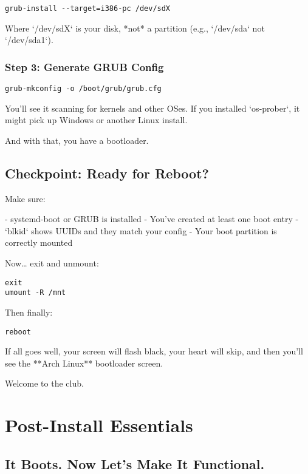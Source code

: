\documentclass[12pt]{book}
\begin{document}
\begin{lstlisting}
grub-install --target=i386-pc /dev/sdX
\end{lstlisting}

Where `/dev/sdX` is your disk, *not* a partition (e.g., `/dev/sda` not `/dev/sda1`).

\subsection*{Step 3: Generate GRUB Config}

\begin{lstlisting}
grub-mkconfig -o /boot/grub/grub.cfg
\end{lstlisting}

You’ll see it scanning for kernels and other OSes. If you installed `os-prober`, it might pick up Windows or another Linux install.

And with that, you have a bootloader.

\section{Checkpoint: Ready for Reboot?}

Make sure:

- systemd-boot or GRUB is installed
- You’ve created at least one boot entry
- `blkid` shows UUIDs and they match your config
- Your boot partition is correctly mounted

Now… exit and unmount:

\begin{lstlisting}
exit
umount -R /mnt
\end{lstlisting}

Then finally:

\begin{lstlisting}
reboot
\end{lstlisting}

If all goes well, your screen will flash black, your heart will skip, and then you’ll see the **Arch Linux** bootloader screen.

Welcome to the club.

\clearpage


\chapter{Post-Install Essentials}

\section*{It Boots. Now Let’s Make It Functional.}
\end{document}
